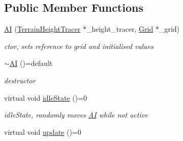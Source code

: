 \subsection*{Public Member Functions}
\begin{DoxyCompactItemize}
\item 
\hyperlink{class_a_i_a15e2ae4f8d6d1fd5956fad8c5c84b307}{A\+I} (\hyperlink{class_terrain_height_tracer}{Terrain\+Height\+Tracer} $\ast$\+\_\+height\+\_\+tracer, \hyperlink{class_grid}{Grid} $\ast$\+\_\+grid)
\begin{DoxyCompactList}\small\item\em ctor, sets reference to grid and initialised values \end{DoxyCompactList}\item 
\hypertarget{class_a_i_afc9d262315171e5d7bbac258353a2a67}{}\hyperlink{class_a_i_afc9d262315171e5d7bbac258353a2a67}{$\sim$\+A\+I} ()=default\label{class_a_i_afc9d262315171e5d7bbac258353a2a67}

\begin{DoxyCompactList}\small\item\em destructor \end{DoxyCompactList}\item 
\hypertarget{class_a_i_a4ad19449eed657aeae4bb42532b52c23}{}virtual void \hyperlink{class_a_i_a4ad19449eed657aeae4bb42532b52c23}{idle\+State} ()=0\label{class_a_i_a4ad19449eed657aeae4bb42532b52c23}

\begin{DoxyCompactList}\small\item\em idle\+State, randomly moves \hyperlink{class_a_i}{A\+I} while not active \end{DoxyCompactList}\item 
\hypertarget{class_a_i_a1082c4d60e50896e533b6ac1d6629fea}{}virtual void \hyperlink{class_a_i_a1082c4d60e50896e533b6ac1d6629fea}{update} ()=0\label{class_a_i_a1082c4d60e50896e533b6ac1d6629fea}


\end{DoxyCompactItemize}
